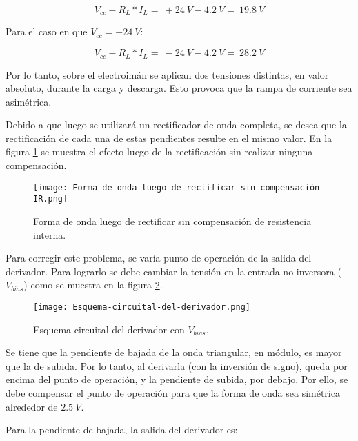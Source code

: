 \begin{equation} \label{eq_Vbus-didt-RL-3}
	V_{cc}-R_L*I_L=\ +24\:V-4.2\:V=\ 19.8\:V
\end{equation}

Para el caso en que $V_{cc}=-24\:V$:

\begin{equation} \label{eq_Vbus-didt-RL-4}
	V_{cc}-R_L*I_L=\ -24\:V-4.2\:V=\ 28.2\:V
\end{equation}

Por lo tanto, sobre el electroimán se aplican dos tensiones distintas, en valor absoluto, durante la carga y descarga. Esto provoca que la rampa de corriente sea asimétrica.

Debido a que luego se utilizará un rectificador de onda completa, se desea que la rectificación de cada una de estas pendientes resulte en el mismo valor. En la figura \ref{fig:img_Forma-de-onda-luego-de-rectificar-sin-compensación-IR} se muestra el efecto luego de la rectificación sin realizar ninguna compensación.

\begin{figure}[H]
	\centering
	\texttt{[image: Forma-de-onda-luego-de-rectificar-sin-compensación-IR.png]}
	\caption{Forma de onda luego de rectificar sin compensación de resistencia interna.}
	\label{fig:img_Forma-de-onda-luego-de-rectificar-sin-compensación-IR}
\end{figure}

Para corregir este problema, se varía punto de operación de la salida del derivador. Para lograrlo se debe cambiar la tensión en la entrada no inversora ($V_{bias}$) como se muestra en la figura \ref{fig:img_Esquema-circuital-del-derivador}. 

\begin{figure}[H]
	\centering
	\texttt{[image: Esquema-circuital-del-derivador.png]}
	\caption{Esquema circuital del derivador con $V_{bias}$.}
	\label{fig:img_Esquema-circuital-del-derivador}
\end{figure}

Se tiene que la pendiente de bajada de la onda triangular, en módulo, es mayor que la de subida. Por lo tanto, al derivarla (con la inversión de signo), queda por encima del punto de operación, y la pendiente de subida, por debajo. Por ello, se debe compensar el punto de operación para que la forma de onda sea simétrica alrededor de $2.5\:V$. 

Para la pendiente de bajada, la salida del derivador es:

